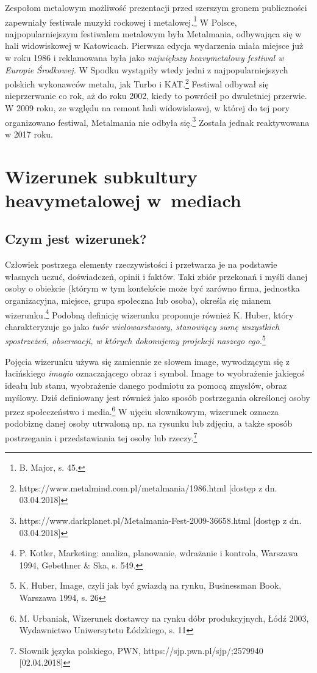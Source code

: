 \documentclass[12pt, a4paper, titlepage]{report}
\begin{document}
Zespołom metalowym możliwość prezentacji przed szerszym gronem publiczności zapewniały festiwale muzyki rockowej i metalowej.\footnote{B. Major, s. 45.} W Polsce, najpopularniejszym festiwalem metalowym była Metalmania, odbywająca się w hali widowiskowej w Katowicach. Pierwsza edycja wydarzenia miała miejsce już w roku 1986 i reklamowana była jako \textit{największy heavymetalowy festiwal w Europie Środkowej.} W Spodku wystąpiły wtedy jedni z najpopularniejszych polskich wykonawców metalu, jak Turbo i KAT.\footnote{https://www.metalmind.com.pl/metalmania/1986.html [dostęp z dn. 03.04.2018]} Festiwal odbywał się nieprzerwanie co rok, aż do roku 2002, kiedy to powrócił po dwuletniej przerwie. W 2009 roku, ze względu na remont hali widowiskowej, w której do tej pory organizowano festiwal, Metalmania nie odbyła się.\footnote{https://www.darkplanet.pl/Metalmania-Fest-2009-36658.html [dostęp z dn. 03.04.2018]} Została jednak reaktywowana w 2017 roku. 

\chapter{Wizerunek subkultury heavymetalowej w~mediach}
\section{Czym jest wizerunek?}
Człowiek postrzega elementy rzeczywistości i przetwarza je na podstawie własnych uczuć, doświadczeń, opinii i faktów. Taki zbiór przekonań i myśli danej osoby o obiekcie (którym w tym kontekście może być zarówno firma, jednostka organizacyjna, miejsce, grupa społeczna lub osoba), określa się mianem wizerunku.\footnote{P. Kotler, Marketing: analiza, planowanie, wdrażanie i kontrola, Warszawa 1994, Gebethner \& Ska, s. 549.} Podobną definicję wizerunku proponuje również K. Huber, który charakteryzuje go jako \textit{twór wielowarstwowy, stanowiący sumę wszystkich spostrzeżeń, obserwacji, w których dokonujemy projekcji naszego ego.}\footnote{K. Huber, Image, czyli jak być gwiazdą na rynku, Businessman Book, Warszawa 1994, s. 26} 

Pojęcia wizerunku używa się zamiennie ze słowem image, wywodzącym się z łacińskiego \textit{imagio} oznaczającego obraz i symbol. Image to wyobrażenie jakiegoś ideału lub stanu, wyobrażenie danego podmiotu za pomocą zmysłów, obraz myślowy. Dziś definiowany jest również jako sposób postrzegania określonej osoby przez społeczeństwo i media.\footnote{M. Urbaniak, Wizerunek dostawcy na rynku dóbr produkcyjnych, Łódź 2003, Wydawnictwo Uniwersytetu Łódzkiego, s. 11} W ujęciu słownikowym, wizerunek oznacza podobiznę danej osoby utrwaloną np. na rysunku lub zdjęciu, a także sposób postrzegania i przedstawiania tej osoby lub rzeczy.\footnote{Słownik języka polskiego, PWN, https://sjp.pwn.pl/sjp/;2579940 [02.04.2018]}
\end{document}
